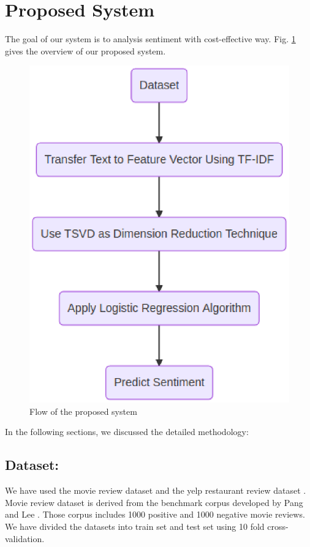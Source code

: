 \documentclass[10pt, conference]{IEEEtran}
\begin{document}
	\section{Proposed System}
The goal of our system is to analysis sentiment with cost-effective way. Fig. \ref{fig:flow} gives the overview of our proposed system.

\begin{figure}
    \begin{center}
        \includegraphics[width = 0.191 \textheight]{flow.eps}
    \end{center}
	\caption{Flow of the proposed system}
	\label{fig:flow}
\end{figure}
	
	In the following sections, we discussed the detailed methodology:
	
	\subsection{\textbf{Dataset:}} We have used the movie review dataset and the yelp restaurant review dataset \cite{b24}. Movie review dataset is derived from the benchmark corpus developed by Pang and Lee \cite{b18}. Those corpus includes 1000 positive and 1000 negative movie reviews. We have divided the datasets into train set and test set using 10 fold cross-validation.
	
\end{document}
